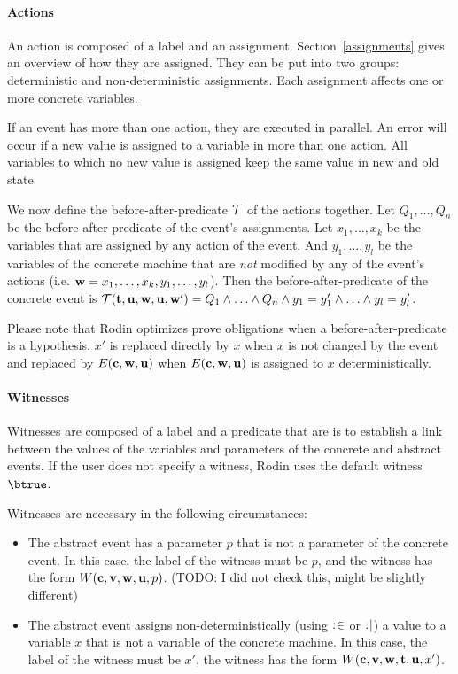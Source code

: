 \paragraph{Actions}
\label{actions}
An action is composed of a label and an assignment.
Section~\ref{assignments} gives an overview of how they are assigned.
They can be put into two groups: deterministic and non-deterministic assignments.
Each assignment affects one or more concrete variables.

If an event has more than one action, they are executed in parallel. 
An error will occur if a new value is assigned to a variable in more than one action.
All variables to which no new value is assigned keep the same value in new and old state.

We now define the before-after-predicate $\mathcal{T}$ of the actions together.
Let $Q_1,\ldots,Q_n$ be the before-after-predicate of the event's assignments. 
Let $x_1,\ldots,x_k$ be the variables that are assigned by any action of the event.
And $y_1,\ldots,y_l$ be the variables of the concrete machine that are \emph{not} modified by any of 
 the event's actions (i.e. $\mathbf{w} = x_1,\ldots,x_k,y_1,\ldots,y_l$).
Then the before-after-predicate of the concrete event is 
  $\mathcal{T}({\mathbf{t},\mathbf{u}},\mathbf{w},\mathbf{u},\mathbf{w}') = Q_1 \land \ldots \land Q_n \land y_1 = y_1' \land \ldots \land y_l=y_l'$.

Please note that Rodin optimizes prove obligations when a before-after-predicate is a hypothesis.
$x'$ is replaced directly by $x$ when $x$ is not changed by the event and replaced by $E(\mathbf{c},\mathbf{w},\mathbf{u})$
 when $E(\mathbf{c},\mathbf{w},\mathbf{u})$ is assigned to $x$ deterministically.

\paragraph{Witnesses}
\label{witness}

Witnesses are composed of a label and a predicate that are is to establish a link between the values 
  of the variables and parameters of the concrete and abstract events.
If the user does not specify a witness, Rodin uses the default witness $\btrue$.

Witnesses are necessary in the following circumstances:
\begin{itemize}
\item The abstract event has a parameter $p$ that is not a parameter of the concrete
  event.
  In this case, the label of the witness must be $p$, and the witness has the form $W(\mathbf{c},{\mathbf{v},\mathbf{w}},\mathbf{u},p)$.
  (TODO: I did not check this, might be slightly different)
\item The abstract event assigns non-deterministically (using $\mathrel{:\mkern1mu\in}$ or $\mathrel{:\mkern1mu\mid}$) 
  a value to a variable $x$ that is not a variable of the concrete machine.
  In this case, the label of the witness must be $x'$, the witness has the form $W(\mathbf{c},{\mathbf{v},\mathbf{w}},{\mathbf{t},\mathbf{u}},x')$.
\end{itemize}

